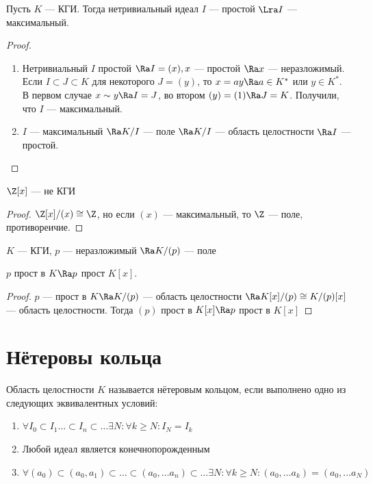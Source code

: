 \begin{proposition}
    Пусть \(K\) --- КГИ. Тогда нетривиальный идеал \(I\) --- простой \(\Lra I\) --- максимальный.
\end{proposition}
\begin{proof}
    \begin{enumerate}
        \item[\(\Ra\)] Нетривиальный \(I\) простой \(\Ra I = (x), x\) --- простой \(\Ra x\) --- неразложимый. Если \(I \subset J \subset K\) для некоторого \(J = (y)\), то \(x = ay \Ra a \in K^*\) или \(y \in K^*\). В первом случае \(x \sim y \Ra I = J\), во втором \((y) = (1) \Ra J = K\). Получили, что \(I\) --- максимальный.

        \item[\(\La\)] \(I\) --- максимальный \(\Ra K/I\) --- поле \(\Ra K/I\) --- область целостности \(\Ra I\) --- простой.
    \end{enumerate}
\end{proof}

\begin{corollary}
    \(\Z[x]\) --- не КГИ
\end{corollary}
\begin{proof}
    \(\Z[x]/(x) \cong \Z\), но если \((x)\) --- максимальный, то \(\Z\) --- поле, противореичие.
\end{proof}

\begin{corollary}
    \(K\) --- КГИ, \(p\) --- неразложимый \(\Ra K/(p)\) --- поле
\end{corollary}

\begin{proposition}
    \(p\) прост в \(K \Ra p\) прост \(K[x]\).
\end{proposition}
\begin{proof}
    \(p\) --- прост в \(K \Ra K/(p)\) --- область целостности \(\Ra K[x]/(p) \cong K/(p)[x]\) --- область целостности. Тогда \((p)\) прост в \(K[x] \Ra p\) прост в \(K[x]\)
\end{proof}

\section{Нётеровы кольца}
\begin{definition}
    Область целостности \(K\) называется нётеровым кольцом, если выполнено одно из следующих эквивалентных условий:
    \begin{enumerate}
        \item \(\forall I_0 \subset I_1 \dots \subset I_n \subset \dots \exists N: \forall k \ge N: I_N = I_k\)
        \item Любой идеал является конечнопорожденным
        \item \(\forall (a_0) \subset (a_0, a_1) \subset \dots \subset (a_0, \dots a_n) \subset \dots \exists N: \forall k \ge N: (a_0, \dots a_k) = (a_0, \dots a_N)\)
    \end{enumerate}
\end{definition}

